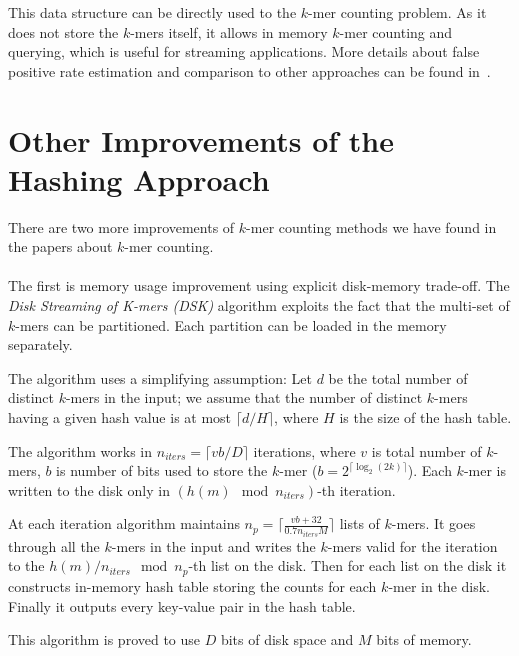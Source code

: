 This data structure can be directly used to the $k$-mer counting problem. As it does not store the $k$-mers itself, it allows in memory $k$-mer counting and querying, which is useful for streaming applications.
More details about false positive rate estimation and comparison to other approaches can be found in~\cite{khmer}.

\section[Other Improvements]{Other Improvements of the Hashing Approach}

There are two more improvements of $k$-mer counting methods we have found in the papers about $k$-mer counting.

\paragraph{} The first is memory usage improvement using explicit disk-memory trade-off. The \emph{Disk Streaming of K-mers (DSK)} algorithm\cite{dsk} exploits the fact that the multi-set of $k$-mers can be partitioned. Each partition can be loaded in the memory separately.

The algorithm uses a simplifying assumption: Let $d$ be the total number of distinct $k$-mers in the input; we assume that the number of distinct $k$-mers having a given hash value is at most $\lceil d/H \rceil$, where $H$ is the size of the hash table\cite{dsk}.

The algorithm works in $n_{iters} = \lceil vb/D\rceil$ iterations, where $v$ is total number of $k$-mers, $b$ is number of bits used to store the $k$-mer ($b = 2^{\lceil\log_2(2k)\rceil}$). Each $k$-mer is written to the disk only in $(h(m) \mod n_{iters})$-th iteration.

At each iteration algorithm maintains $n_p = \lceil\frac{vb+32}{0.7n_{iters}M}\rceil$ lists of $k$-mers.
It goes through all the $k$-mers in the input and writes the $k$-mers valid for the iteration to the $h(m)/n_{iters} \mod n_p$-th list on the disk.
Then for each list on the disk it constructs in-memory hash table storing the counts for each $k$-mer in the disk.
Finally it outputs every key-value pair in the hash table.

This algorithm is proved to use $D$ bits of disk space and $M$ bits of memory\cite{dsk}.

